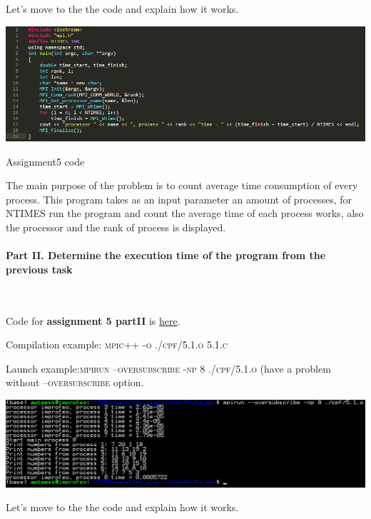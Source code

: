 \documentclass[%
12pt, %
final, %
oneside, %
onecolumn, %
centertags]{article} %
\theoremstyle{plain}
\theoremstyle{definition}
\theoremstyle{remark}
\begin{document}
Let's move to the the code and explain how it works.

\begin{center}
		\includegraphics[scale=0.75]{5.1.code.png}

		Assignment5 code
\end{center}

The main purpose of the problem is to count average time consumption of every process. This program takes as an input parameter an amount of processes, for \textsc{NTIMES} run the program and count the average time of each process works, also the processor and the rank of process is displayed.

\paragraph{Part II. Determine the execution time of the program from the previous task}

$\ $

Code for \textbf{assignment 5 partII} is \href{https:\//github.com/aptmess/parallel_algorithms/blob/master/HT/hw_mpi/5.1.c}{here}.

Compilation example: \textsc{mpic++ -o ./cpf/5.1.o 5.1.c}

Launch example:\textsc{mpirun --oversubscribe -np 8 ./cpf/5.1.o} (have a problem without \textsc{--oversubscribe} option.

\begin{center}
\includegraphics[scale=0.55]{5.2.png}
\end{center}

Let's move to the the code and explain how it works.
\end{document}
